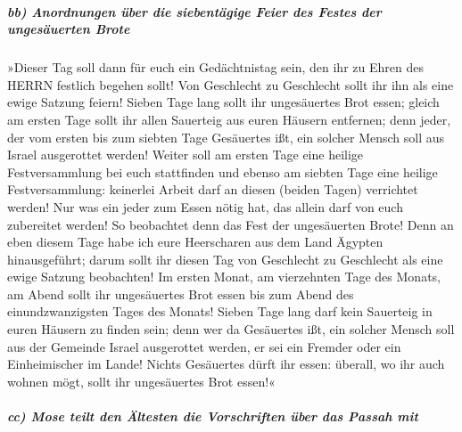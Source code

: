 \hypertarget{bb-anordnungen-uxfcber-die-siebentuxe4gige-feier-des-festes-der-ungesuxe4uerten-brote}{%
\subparagraph{bb) Anordnungen über die siebentägige Feier des Festes der
ungesäuerten
Brote}\label{bb-anordnungen-uxfcber-die-siebentuxe4gige-feier-des-festes-der-ungesuxe4uerten-brote}}

 »Dieser Tag soll dann für euch ein Gedächtnistag sein,
den ihr zu Ehren des HERRN festlich begehen sollt! Von Geschlecht zu
Geschlecht sollt ihr ihn als eine ewige Satzung feiern! 
Sieben Tage lang sollt ihr ungesäuertes Brot essen; gleich am ersten
Tage sollt ihr allen Sauerteig aus euren Häusern entfernen; denn jeder,
der vom ersten bis zum siebten Tage Gesäuertes ißt, ein solcher Mensch
soll aus Israel ausgerottet werden!  Weiter soll am
ersten Tage eine heilige Festversammlung bei euch stattfinden und ebenso
am siebten Tage eine heilige Festversammlung: keinerlei Arbeit darf an
diesen (beiden Tagen) verrichtet werden! Nur was ein jeder zum Essen
nötig hat, das allein darf von euch zubereitet werden! 
So beobachtet denn das Fest der ungesäuerten Brote! Denn an eben diesem
Tage habe ich eure Heerscharen aus dem Land Ägypten hinausgeführt; darum
sollt ihr diesen Tag von Geschlecht zu Geschlecht als eine ewige Satzung
beobachten!  Im ersten Monat, am vierzehnten Tage des
Monats, am Abend sollt ihr ungesäuertes Brot essen bis zum Abend des
einundzwanzigsten Tages des Monats!  Sieben Tage lang
darf kein Sauerteig in euren Häusern zu finden sein; denn wer da
Gesäuertes ißt, ein solcher Mensch soll aus der Gemeinde Israel
ausgerottet werden, er sei ein Fremder oder ein Einheimischer im Lande!
 Nichts Gesäuertes dürft ihr essen: überall, wo ihr auch
wohnen mögt, sollt ihr ungesäuertes Brot essen!«

\hypertarget{cc-mose-teilt-den-uxe4ltesten-die-vorschriften-uxfcber-das-passah-mit}{%
\subparagraph{cc) Mose teilt den Ältesten die Vorschriften über das
Passah
mit}\label{cc-mose-teilt-den-uxe4ltesten-die-vorschriften-uxfcber-das-passah-mit}}

